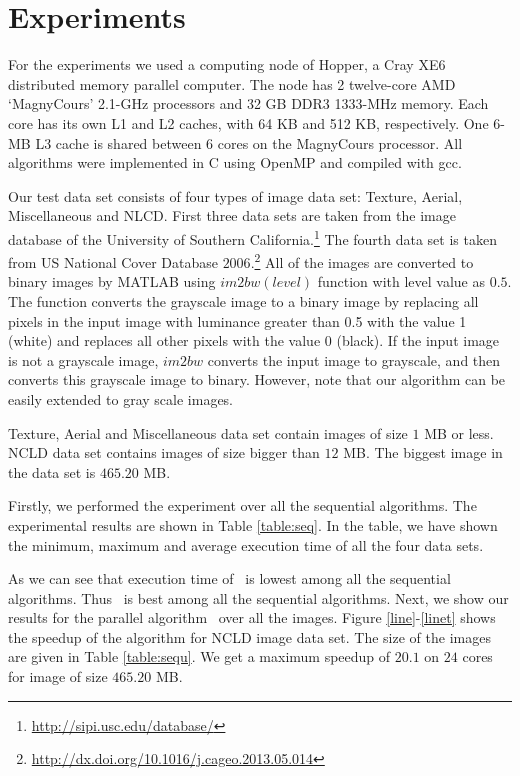 \vspace{\sectionSpace}
\section{Experiments}
\label{sec:experiments}



For the experiments we used a computing node of Hopper, a Cray XE6 distributed memory parallel computer. 
The node has 2 twelve-core AMD ‘MagnyCours’ 2.1-GHz processors and 32 GB DDR3 1333-MHz memory. 
Each core has its own L1 and L2 caches, with 64 KB and 512 KB, respectively. 
One 6-MB L3 cache is shared between 6 cores on the MagnyCours processor. 
All algorithms were implemented in C using OpenMP and compiled with gcc.

Our test data set consists of four types of image data set: Texture, Aerial,
Miscellaneous and NLCD. First three data sets are taken from the image database of the University of 
Southern
California.\footnote{\url{http://sipi.usc.edu/database/}} 
The fourth data set is taken from US National Cover Database
$2006$.\footnote{\url{http://dx.doi.org/10.1016/j.cageo.2013.05.014}} All of the
images are converted to binary images by MATLAB using $im2bw(level)$ function with level value as $0.5$. The function 
converts the grayscale image to a binary image by replacing all pixels in the input image with luminance greater than 
0.5 with the value 1 (white) and replaces all other pixels with the value 0 (black). If the input image is not a grayscale image, 
$im2bw$ converts the input image to grayscale, and then converts this grayscale image to binary. However, note that our
algorithm can be easily extended to gray scale images.

Texture, Aerial and Miscellaneous data set contain images of size $1$ MB or less.
NCLD data set contains images of size bigger than $12$ MB. The biggest image in the data set is $465.20$ MB.

Firstly, we performed the experiment over all the sequential algorithms. The
experimental results are shown in Table \ref{table:seq}. In the table, we have
shown the minimum, maximum and average execution time of all the four data sets. 





As we can see that execution time of \aremsp\ is lowest among all
the sequential algorithms. Thus \aremsp\ is best among all the sequential
algorithms.
Next, we show our results for the parallel algorithm \paremsp\ over all the images.
Figure \ref{line}-\ref{linet} shows the speedup of the algorithm for 
NCLD image data set. The size of the images are given in Table \ref{table:sequ}.
We get a maximum speedup of $20.1$ on $24$ cores for image of size $465.20$ MB.

